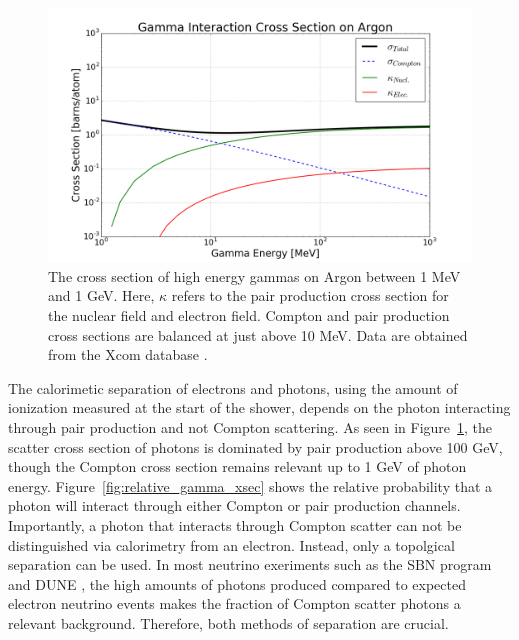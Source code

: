 \begin{figure}[ht!]
  \includegraphics[width=\textwidth]{emshower_figures/photonCrossSection.png}
  \caption[Photon Cross Section on Argon]{\label{fig:gamma_xsec} The cross section of high energy gammas on Argon between 1 MeV and 1 GeV.  Here, $\kappa$ refers to the pair production cross section for the nuclear field and electron field.  Compton and pair production cross sections are balanced at just above 10 MeV.  Data are obtained from the Xcom database \cite{Xcom}.}
\end{figure}

The calorimetic separation of electrons and photons, using the amount of ionization measured at the start of the shower, depends on the photon interacting through pair production and not Compton scattering.  As seen in Figure~\ref{fig:gamma_xsec}, the scatter cross section of photons is dominated by pair production above 100 GeV, though the Compton cross section remains relevant up to 1 GeV of photon energy.  Figure~\ref{fig:relative_gamma_xsec} shows the relative probability that a photon will interact through either Compton or pair production channels.  Importantly, a photon that interacts through Compton scatter can not be distinguished via calorimetry from an electron.  Instead, only a topolgical separation can be used.  In most neutrino exeriments such as the SBN program \cite{SBN} and DUNE \cite{DUNE}, the high amounts of photons produced compared to expected electron neutrino events makes the fraction of Compton scatter photons a relevant background.  Therefore, both methods of separation are crucial.

